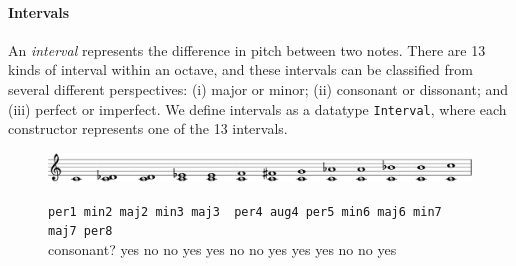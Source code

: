 
\paragraph{Intervals}

An \emph{interval} represents the difference in pitch between
two notes.
There are 13 kinds of interval within an octave, and these
intervals can be classified from several different perspectives:
(i) major or minor; (ii) consonant or dissonant; and (iii) perfect
or imperfect.
We define intervals as a datatype \texttt{Interval}, where each
constructor represents one of the 13 intervals.

\begin{figure}[h]
  \includegraphics[width=12cm]{fig/interval.png} \\
  \begin{flushleft}
    \begin{footnotesize}
      \hspace{1.45cm} \texttt{per1 \hspace{0.5mm} min2  \hspace{2.5mm}
        maj2 \hspace{1.2mm} min3 \hspace{0.5mm} maj3 \ per4
        \hspace{1mm}aug4
        \hspace{0.5mm}  per5\hspace{1.2mm}  min6\hspace{1.6mm} maj6
        \hspace{1.6mm}min7\hspace{1.2mm} maj7\hspace{1.2mm} per8} \\
      consonant? \hspace{1.5mm} yes \hspace{4.2mm} no \hspace{6.5mm}  no
      \hspace{4.7mm} yes \hspace{3.8mm}  yes \hspace{3.7mm} no \hspace{3.5mm}
      no \hspace{4.3mm} yes \hspace{3.8mm} yes \hspace{3.2mm} yes
      \hspace{3.7mm} no \hspace{4mm} no \hspace{3.8mm} yes
    \end{footnotesize}
  \end{flushleft}
\end{figure}